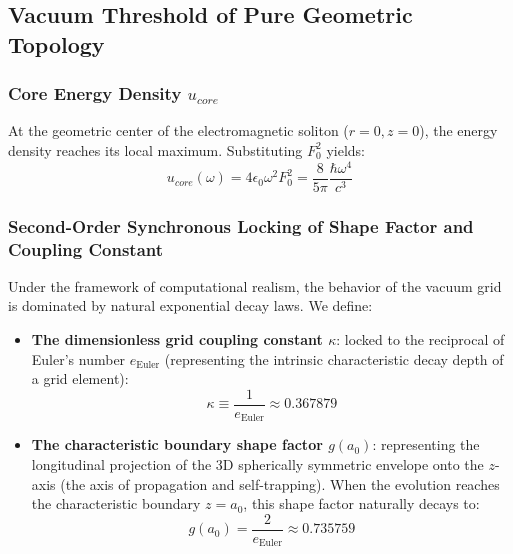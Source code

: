 \documentclass[12pt, a4paper]{article}
\begin{document}
\subsection{Vacuum Threshold of Pure Geometric Topology}

\subsubsection{Core Energy Density $u_{core}$}

At the geometric center of the electromagnetic soliton ($r=0, z=0$), the energy density reaches its local maximum. Substituting $F_0^2$ yields:
\begin{equation}
u_{core}(\omega) = 4 \epsilon_0 \omega^2 F_0^2 = \frac{8}{5\pi} \frac{\hbar \omega^4}{c^3}
\end{equation}

\subsubsection{Second-Order Synchronous Locking of Shape Factor and Coupling Constant}

Under the framework of computational realism, the behavior of the vacuum grid is dominated by natural exponential decay laws. We define:
\begin{itemize}
    \item \textbf{The dimensionless grid coupling constant $\kappa$}: locked to the reciprocal of Euler's number $e_{\text{Euler}}$ (representing the intrinsic characteristic decay depth of a grid element):
    \begin{equation}
    \kappa \equiv \frac{1}{e_{\text{Euler}}} \approx 0.367879
    \end{equation}
    
    \item \textbf{The characteristic boundary shape factor $g(a_0)$}: representing the longitudinal projection of the 3D spherically symmetric envelope onto the $z$-axis (the axis of propagation and self-trapping). When the evolution reaches the characteristic boundary $z = a_0$, this shape factor naturally decays to:
    \begin{equation}
    g(a_0) = \frac{2}{e_{\text{Euler}}} \approx 0.735759
    \end{equation}
\end{itemize}
\end{document}
